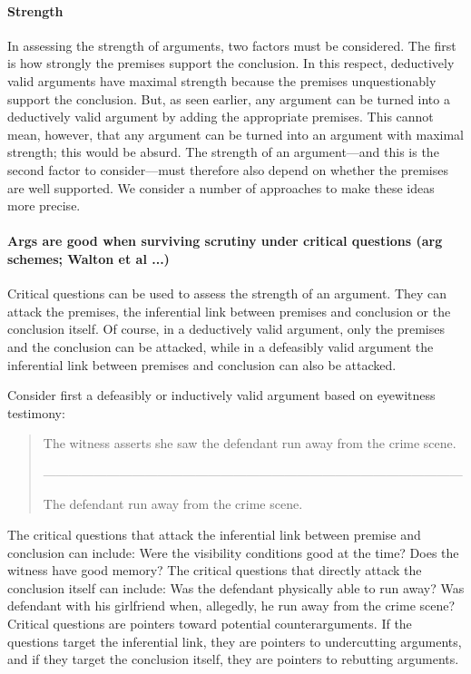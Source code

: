 \documentclass[10pt]{article}
\begin{document}
\paragraph{Strength} In assessing the strength of arguments, two factors must be considered. The first is how strongly the premises support the conclusion. In this respect, deductively valid arguments have maximal strength because the premises unquestionably support the conclusion. But, as seen earlier, any argument can be turned into a deductively valid argument by adding the appropriate premises. This cannot mean, however, that any argument can be turned into an argument with maximal strength; this would be absurd. The strength of an argument---and this is the second factor to consider---must therefore also depend on whether the premises are well supported. We consider a number of approaches to make these ideas more precise. 


\paragraph{Args are good when surviving scrutiny under critical questions (arg schemes; Walton et al ...)}

Critical questions can be used to assess the strength of an argument. They can attack the premises, the inferential link between premises and conclusion or the conclusion itself. Of course, in a deductively valid argument, only the premises and the conclusion can be attacked, 
while in a defeasibly valid argument the inferential link between premises and conclusion 
can also be attacked. 

Consider first a defeasibly or inductively valid 
argument based on eyewitness testimony:
%
\begin{quote}
The witness asserts she saw the defendant run away from the crime scene.

---------------------------------------------------------------------------------------------------

The defendant run away from the crime scene.
\end{quote}
%
The critical questions that attack the inferential link between premise and conclusion can include: Were the visibility conditions good at the time? Does the witness have good memory? The critical questions that directly attack the conclusion itself can include: Was the defendant physically able to run away? Was defendant with his girlfriend when, allegedly, he run away from the crime scene? Critical questions are pointers toward potential counterarguments. If the questions target the inferential link, they are pointers to undercutting arguments, and if they target the conclusion itself, they are pointers to rebutting arguments. 
\end{document}
